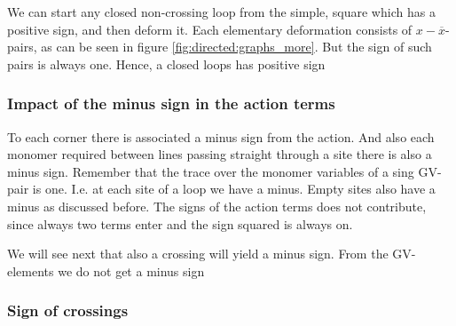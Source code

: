 We can start any closed non-crossing loop  from the simple, square which has a positive sign, and then 
deform it. Each elementary deformation consists of  $x-\overline{x}$-pairs, as can be seen in 
figure \ref{fig:directed:graphs_more}. But the sign of such pairs is always one. Hence,
a closed loops has positive sign


\clearpage

\subsubsection{Impact of the minus sign in the action terms}

To each corner there is associated a minus sign from the action. And also each monomer
required between  lines  passing straight through a site there is also a minus sign. Remember
that the trace over the monomer variables of a sing GV-pair is one. I.e. at each site of a loop we have a minus. Empty sites also have a minus as discussed before. The signs of the action terms does not contribute, since always two terms enter and the sign squared is always on.

We will see  next that also a crossing will yield a minus sign. From the GV-elements we do not get a minus sign






\subsubsection{Sign of crossings}




